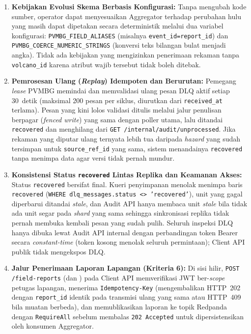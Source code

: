 \begin{enumerate}
    \item \textbf{Kebijakan Evolusi Skema Berbasis Konfigurasi:} Tanpa mengubah kode sumber, operator dapat menyesuaikan Aggregator terhadap perubahan hulu yang masih dapat dipetakan secara deterministik melalui dua variabel konfigurasi: \texttt{PVMBG\_FIELD\_ALIASES} (misalnya \texttt{event\_id=report\_id}) dan \texttt{PVMBG\_COERCE\_NUMERIC\_STRINGS} (konversi teks bilangan bulat menjadi angka). Tidak ada kebijakan yang mengizinkan penerimaan rekaman tanpa \texttt{volcano\_id} karena atribut wajib tersebut tidak boleh ditebak.
    \item \textbf{Pemrosesan Ulang (\textit{Replay}) Idempoten dan Berurutan:} Pemegang \textit{lease} PVMBG memindai dan memvalidasi ulang pesan DLQ aktif setiap 30~detik (maksimal 200 pesan per siklus, diurutkan dari \texttt{received\_at} terlama). Pesan yang kini lolos validasi ditulis melalui jalur penulisan berpagar (\textit{fenced write}) yang sama dengan poller utama, lalu ditandai \texttt{recovered} dan menghilang dari \texttt{GET /internal/audit/unprocessed}. Jika rekaman yang diputar ulang ternyata lebih tua daripada \textit{hazard} yang sudah tersimpan untuk \texttt{source\_ref\_id} yang sama, sistem menandainya \texttt{recovered} tanpa menimpa data agar versi tidak pernah mundur.
    \item \textbf{Konsistensi Status \texttt{recovered} Lintas Replika dan Keamanan Akses:} Status \texttt{recovered} bersifat final. Kueri penyimpanan menolak menimpa baris \texttt{recovered} (\texttt{WHERE dlq\_messages.status <> 'recovered'}), unit yang gagal diperbarui ditandai \textit{stale}, dan Audit API hanya membaca unit \textit{stale} bila tidak ada unit segar pada \textit{shard} yang sama sehingga sinkronisasi replika tidak pernah membuka kembali pesan yang sudah pulih. Seluruh inspeksi DLQ hanya dibuka lewat Audit API internal dengan perbandingan token Bearer secara \textit{constant-time} (token kosong menolak seluruh permintaan); Client API publik tidak mengekspos DLQ.
    \item \textbf{Jalur Penerimaan Laporan Lapangan (Kriteria 6):} Di sisi hilir, \texttt{POST /field-reports} (dan ) pada Client API memverifikasi JWT ber-\textit{scope} petugas lapangan, menerima \texttt{Idempotency-Key} (mengembalikan HTTP~202 dengan \texttt{report\_id} identik pada transmisi ulang yang sama atau HTTP~409 bila muatan berbeda), dan memublikasikan laporan ke topik Redpanda  dengan \texttt{RequireAll} sebelum membalas \texttt{202 Accepted} untuk dipersistensikan oleh konsumen Aggregator.
\end{enumerate}

